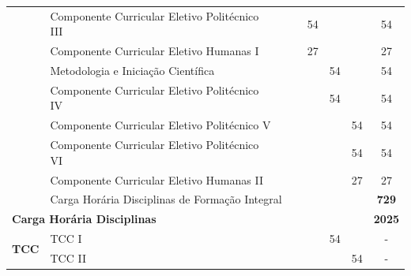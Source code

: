 \documentclass[11pt,fleqn]{book} %
\begin{document}
\begin{table}[]
{\begin{tabular}{|l|l|c|c|c|c|c|c|}
				& Componente Curricular Eletivo Politécnico III &                      &                      & 54                   &                      &                      & 54            \\ \cline{2-8} 
				& Componente Curricular Eletivo Humanas I       &                      &                      & 27                   &                      &                      & 27            \\ \cline{2-8} 
				& Metodologia e Iniciação Científica            &                      &                      &                      & 54                   &                      & 54            \\ \cline{2-8} 
				& Componente Curricular Eletivo Politécnico IV  &                      &                      &                      & 54                   &                      & 54            \\ \cline{2-8} 
				& Componente Curricular Eletivo Politécnico V   &                      &                      &                      &                      & 54                   & 54            \\ \cline{2-8} 
				& Componente Curricular Eletivo Politécnico VI  &                      &                      &                      &                      & 54                   & 54            \\ \cline{2-8} 
				& Componente Curricular Eletivo Humanas II      &                      &                      &                      &                      & 27                   & 27            \\ \cline{2-8} 
				& \multicolumn{6}{l|}{Carga Horária Disciplinas de Formação Integral}                                                                                              & \textbf{729}  \\ \hline
				\multicolumn{7}{|l|}{\textbf{Carga Horária Disciplinas}}                                                                                                                                                         & \textbf{2025} \\ \hline
				\multirow{2}{*}{\textbf{TCC}}                 & TCC I                                         &                      &                      &                      & 54                   &                      & -             \\ \cline{2-8} 
				& TCC II                                        &                      &                      &                      &                      & 54                   & -             \\ \hline

\end{tabular}}
\end{table}
\end{document}
